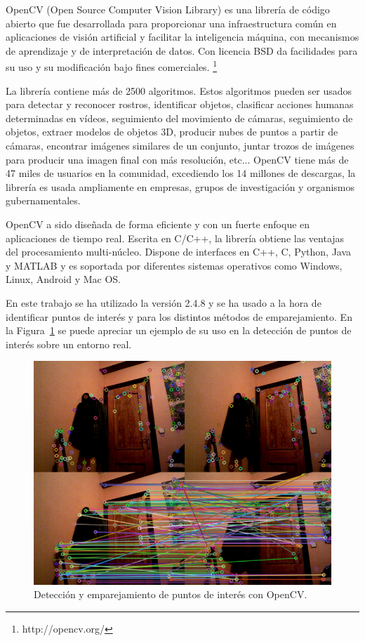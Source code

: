 OpenCV (Open Source Computer Vision Library) es una librería de código abierto que fue desarrollada para proporcionar una infraestructura común en aplicaciones de visión artificial y facilitar la inteligencia máquina, con mecanismos de aprendizaje y de interpretación de datos. Con licencia BSD da facilidades para su uso y su modificación bajo fines comerciales. \footnote{http://opencv.org/}

La librería contiene más de 2500 algoritmos. Estos algoritmos pueden ser usados para detectar y reconocer rostros, identificar objetos, clasificar acciones humanas determinadas en vídeos, seguimiento del movimiento de cámaras, seguimiento de objetos, extraer modelos de objetos 3D, producir nubes de puntos a partir de cámaras, encontrar imágenes similares de un conjunto, juntar trozos de imágenes para producir una imagen final con más resolución, etc... OpenCV tiene más de 47 miles de usuarios en la comunidad, excediendo los 14 millones de descargas, la librería es usada ampliamente en empresas, grupos de investigación y organismos gubernamentales.

OpenCV a sido diseñada de forma eficiente y con un fuerte enfoque en aplicaciones de tiempo real. Escrita en C/C++, la librería obtiene las ventajas del procesamiento multi-núcleo. Dispone de interfaces en C++, C, Python, Java y MATLAB y es soportada por diferentes sistemas operativos como Windows, Linux, Android y Mac OS.

En este trabajo se ha utilizado la versión 2.4.8 y se ha usado a la hora de identificar puntos de interés y para los distintos métodos de emparejamiento. En la Figura~\ref{fig:SiftDetector2} se puede apreciar un ejemplo de su uso en la detección de puntos de interés sobre un entorno real.

\begin{figure}[th]
\centering
\includegraphics[scale=0.5]{Figures/sift-detector2.png}
\decoRule
\caption[sift-detector2]{Detección y emparejamiento de puntos de interés con OpenCV.}
\label{fig:SiftDetector2}
\end{figure}

